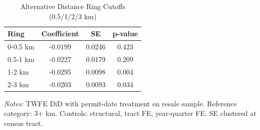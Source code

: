 \begin{table}[htbp]
\centering
\caption{Alternative Distance Ring Cutoffs (0.5/1/2/3 km)}
\label{tab:alt_rings}
\small
\begin{tabular}{lccc}
\toprule
Ring & Coefficient & SE & p-value \\
\midrule
0-0.5 km & -0.0199 & 0.0246 & 0.423 \\
0.5-1 km & -0.0227 & 0.0179 & 0.209 \\
1-2 km & -0.0295 & 0.0098 & 0.004 \\
2-3 km & -0.0203 & 0.0093 & 0.034 \\
\bottomrule
\end{tabular}
\begin{tablenotes}\small
\item \textit{Notes:} TWFE DiD with permit-date treatment on resale sample.  Reference category: 3+ km. Controls: structural, tract FE, year-quarter FE.  SE clustered at census tract.
\end{tablenotes}
\end{table}
